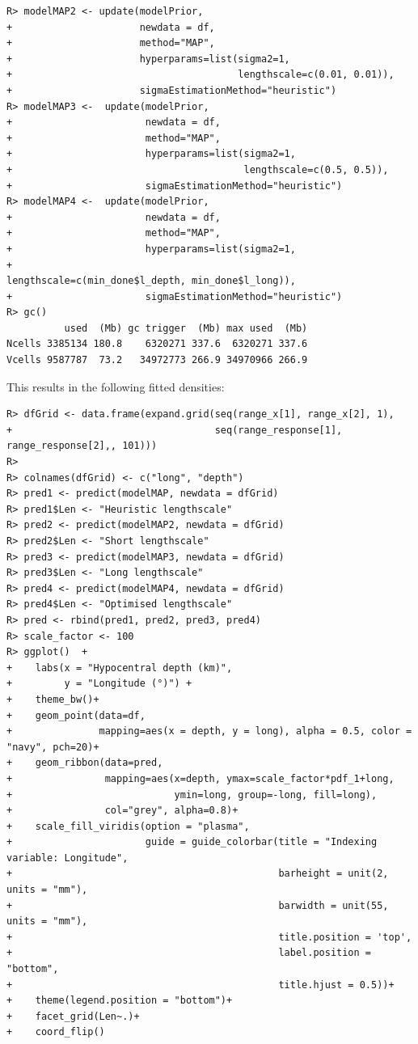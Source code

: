 \documentclass[
]{article}
\begin{document}
\begin{verbatim}
R> modelMAP2 <- update(modelPrior, 
+                      newdata = df, 
+                      method="MAP", 
+                      hyperparams=list(sigma2=1, 
+                                       lengthscale=c(0.01, 0.01)),
+                      sigmaEstimationMethod="heuristic")
R> modelMAP3 <-  update(modelPrior,
+                       newdata = df, 
+                       method="MAP", 
+                       hyperparams=list(sigma2=1, 
+                                        lengthscale=c(0.5, 0.5)),
+                       sigmaEstimationMethod="heuristic")
R> modelMAP4 <-  update(modelPrior,
+                       newdata = df, 
+                       method="MAP", 
+                       hyperparams=list(sigma2=1, 
+                                        lengthscale=c(min_done$l_depth, min_done$l_long)),
+                       sigmaEstimationMethod="heuristic")
R> gc()
          used  (Mb) gc trigger  (Mb) max used  (Mb)
Ncells 3385134 180.8    6320271 337.6  6320271 337.6
Vcells 9587787  73.2   34972773 266.9 34970966 266.9
\end{verbatim}

This results in the following fitted densities:

\begin{verbatim}
R> dfGrid <- data.frame(expand.grid(seq(range_x[1], range_x[2], 1), 
+                                   seq(range_response[1], range_response[2],, 101)))
R> 
R> colnames(dfGrid) <- c("long", "depth")
R> pred1 <- predict(modelMAP, newdata = dfGrid)
R> pred1$Len <- "Heuristic lengthscale"
R> pred2 <- predict(modelMAP2, newdata = dfGrid)
R> pred2$Len <- "Short lengthscale"
R> pred3 <- predict(modelMAP3, newdata = dfGrid)
R> pred3$Len <- "Long lengthscale"
R> pred4 <- predict(modelMAP4, newdata = dfGrid)
R> pred4$Len <- "Optimised lengthscale"
R> pred <- rbind(pred1, pred2, pred3, pred4)
R> scale_factor <- 100
R> ggplot()  +
+    labs(x = "Hypocentral depth (km)",
+         y = "Longitude (°)") +
+    theme_bw()+
+    geom_point(data=df,
+               mapping=aes(x = depth, y = long), alpha = 0.5, color = "navy", pch=20)+
+    geom_ribbon(data=pred,
+                mapping=aes(x=depth, ymax=scale_factor*pdf_1+long, 
+                            ymin=long, group=-long, fill=long),
+                col="grey", alpha=0.8)+
+    scale_fill_viridis(option = "plasma",
+                       guide = guide_colorbar(title = "Indexing variable: Longitude",
+                                              barheight = unit(2, units = "mm"),
+                                              barwidth = unit(55, units = "mm"),
+                                              title.position = 'top',
+                                              label.position = "bottom",
+                                              title.hjust = 0.5))+
+    theme(legend.position = "bottom")+
+    facet_grid(Len~.)+
+    coord_flip()
\end{verbatim}
\end{document}
